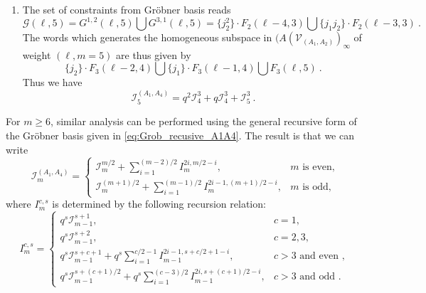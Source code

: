 \documentclass[a4paper,10pt]{article}
\begin{document}
\begin{appendix}
\begin{enumerate}
\begin{equation}
\end{equation}
\item
The set of constraints from Gr\"{o}bner basis reads
\begin{equation}
    \mathcal{G}(\ell,5) =G^{1,2}(\ell,5)\bigcup G^{3,1}(\ell,5) = \{j_2^2\}\cdot F_2(\ell-4,3)\bigcup\{j_1j_2\}\cdot F_2(\ell-3,3)~.
\end{equation}
The words which generates the homogeneous subspace in $(A(\mathcal{V}_{(A_1,A_2)})_\infty$ of weight $(\ell,m =5)$ are thus given by
\begin{equation}
    \{j_2\}\cdot F_3(\ell-2,4)\bigcup \{j_1\}\cdot F_3(\ell-1,4) \bigcup F_3(\ell,5)~.
\end{equation}
Thus we have
\begin{equation}
    \mathcal{I}_5^{(A_1,A_4)} = q^2 \mathcal{I}_4^3 + q \mathcal{I}_4^3 + \mathcal{I}_5^3~.
\end{equation}
\end{enumerate}
For $m\geq 6$, similar analysis can be performed using the general recursive form of the Gr\"{o}bner basis given in \eqref{eq:Grob_recusive_A1A4}. The result is that we can write
\begin{equation}
    \mathcal{I}_m^{(A_1,A_4)} = \begin{cases}\mathcal{I}_m^{m/2}+
\sum_{i=1}^{(m-2)/2}I^{2i, m/2 -i}_m, &m\text{  is even,}\\
\mathcal{I}_m^{(m+1)/2} +\sum_{i =1}^{(m-1)/2} I_m^{2i -1,(m+1)/2 -i}, & m \text{ is odd},
\end{cases}
\end{equation}
where  $I^{c,s}_m$ is determined by the following recursion relation:
\begin{equation}
I_m^{c, s}= \begin{cases}q^s \mathcal{I}_{m-1}^{s+1}, & c=1, \\ q^s \mathcal{I}_{m-1}^{s+2}, & c=2,3, \\ q^s \mathcal{I}_{m-1}^{s+c+1}+q^s \sum_{i=1}^{c / 2-1} I_{m-1}^{2 i-1, s+c / 2+1-i}, & c>3 \text { and even }, \\ q^s \mathcal{I}_{m-1}^{s+(c+1) / 2}+q^s \sum_{i=1}^{(c-3) / 2} I_{m-1}^{2 i, s+(c+1) / 2-i}, & c>3 \text { and odd~. }\end{cases}    
\end{equation}

\end{appendix}
\end{document}
